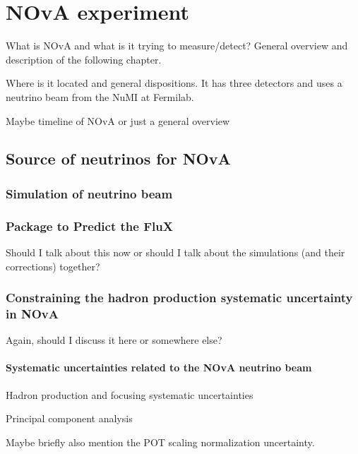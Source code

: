 \chapter{NOvA experiment}\label{sec:NOvA}


What is NOvA and what is it trying to measure/detect? General overview and description of the following chapter.

Where is it located and general dispositions. It has three detectors and uses a neutrino beam from the NuMI at Fermilab.

Maybe timeline of NOvA or just a general overview

\section{Source of neutrinos for NOvA}

\subsection{Simulation of neutrino beam}

\subsection{Package to Predict the FluX}
Should I talk about this now or should I talk about the simulations (and their corrections) together? 

\subsection{Constraining the hadron production systematic uncertainty in NOvA}
Again, should I discuss it here or somewhere else?

\subsubsection{Systematic uncertainties related to the NOvA neutrino beam}

Hadron production and focusing systematic uncertainties

Principal component analysis

Maybe briefly also mention the POT scaling normalization uncertainty.

